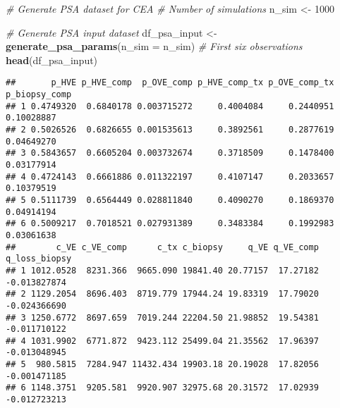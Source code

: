 \documentclass[
]{article}
\newenvironment{Shaded}{\begin{snugshade}}{\end{snugshade}}
\newcommand{\CommentTok}[1]{\textcolor[rgb]{0.56,0.35,0.01}{\textit{#1}}}
\newcommand{\DataTypeTok}[1]{\textcolor[rgb]{0.13,0.29,0.53}{#1}}
\newcommand{\DecValTok}[1]{\textcolor[rgb]{0.00,0.00,0.81}{#1}}
\newcommand{\KeywordTok}[1]{\textcolor[rgb]{0.13,0.29,0.53}{\textbf{#1}}}
\newcommand{\NormalTok}[1]{#1}
\newcommand{\StringTok}[1]{\textcolor[rgb]{0.31,0.60,0.02}{#1}}
\begin{document}
\begin{Shaded}
\begin{Highlighting}[]
\CommentTok{# Generate PSA dataset for CEA}
\CommentTok{# Number of simulations}
\NormalTok{n_sim <-}\StringTok{ }\DecValTok{1000}

\CommentTok{# Generate PSA input dataset}
\NormalTok{df_psa_input <-}\StringTok{ }\KeywordTok{generate_psa_params}\NormalTok{(}\DataTypeTok{n_sim =}\NormalTok{ n_sim)}
\CommentTok{# First six observations}
\KeywordTok{head}\NormalTok{(df_psa_input)}
\end{Highlighting}
\end{Shaded}

\begin{verbatim}
##       p_HVE p_HVE_comp  p_OVE_comp p_HVE_comp_tx p_OVE_comp_tx p_biopsy_comp
## 1 0.4749320  0.6840178 0.003715272     0.4004084     0.2440951    0.10028887
## 2 0.5026526  0.6826655 0.001535613     0.3892561     0.2877619    0.04649270
## 3 0.5843657  0.6605204 0.003732674     0.3718509     0.1478400    0.03177914
## 4 0.4724143  0.6661886 0.011322197     0.4107147     0.2033657    0.10379519
## 5 0.5111739  0.6564449 0.028811840     0.4090270     0.1869370    0.04914194
## 6 0.5009217  0.7018521 0.027931389     0.3483384     0.1992983    0.03061638
##        c_VE c_VE_comp      c_tx c_biopsy     q_VE q_VE_comp q_loss_biopsy
## 1 1012.0528  8231.366  9665.090 19841.40 20.77157  17.27182  -0.013827874
## 2 1129.2054  8696.403  8719.779 17944.24 19.83319  17.79020  -0.024366690
## 3 1250.6772  8697.659  7019.244 22204.50 21.98852  19.54381  -0.011710122
## 4 1031.9902  6771.872  9423.112 25499.04 21.35562  17.96397  -0.013048945
## 5  980.5815  7284.947 11432.434 19903.18 20.19028  17.82056  -0.001471185
## 6 1148.3751  9205.581  9920.907 32975.68 20.31572  17.02939  -0.012723213
\end{verbatim}
\end{document}
